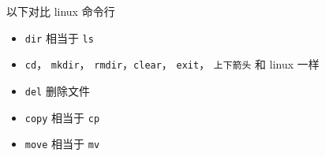 
以下对比 linux 命令行
\begin{itemize}
\item \verb`dir` 相当于 \verb`ls`
\item \verb`cd`， \verb`mkdir`， \verb`rmdir`，\verb`clear`， \verb`exit`， \verb`上下箭头` 和 linux 一样
\item \verb`del` 删除文件
\item \verb`copy` 相当于 \verb`cp`
\item \verb`move` 相当于 \verb`mv`
\end{itemize}

